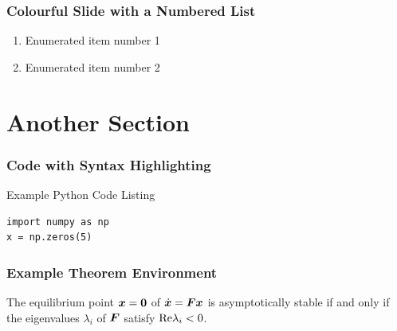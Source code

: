 \documentclass[fleqn]{qu-slides}
\begin{document}


\SlideThemeWhite
\begin{frame}
    \frametitle{Colourful Slide with a Numbered List}
    \begin{enumerate}
        \item Enumerated item number 1
        \item Enumerated item number 2
    \end{enumerate}
\end{frame}


\section{Another Section}

\SlideThemeGrey
\begin{frame}
    \flushleft
    {\bf\LARGE \insertsection}
\end{frame}


\SlideWhite
\begin{frame}[fragile]
    \frametitle{Code with Syntax Highlighting}
    \begin{block}{Example Python Code Listing}
    \begin{verbatim}
import numpy as np
x = np.zeros(5)
    \end{verbatim}
    \end{block}
\end{frame}


\SlideWhite
\begin{frame}[fragile]
    \frametitle{Example Theorem Environment}
    \begin{thm}
        The equilibrium point $\bm{x}=\bm{0}$ of $\dot{\bm{x}}=\bm{Fx}$ is asymptotically stable if and only if the eigenvalues $\lambda_{i}$ of $\bm{F}$ satisfy $\textup{Re}\lambda_{i}<0$.
    \end{thm}
\end{frame}
\end{document}
